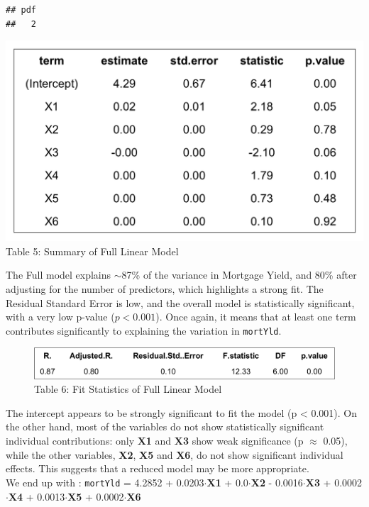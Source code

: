 \documentclass[
  12pt,
]{article}
\begin{document}
\begin{verbatim}
## pdf 
##   2
\end{verbatim}

\begin{minipage}{0.42\textwidth}
\includegraphics[width=1\linewidth]{figures/full_model_summary_table.png}
\vspace{-0.2em}
{\fontsize{12}{14}\selectfont Table 5: Summary of Full Linear Model}
\end{minipage}
\hfill
\begin{minipage}{0.55\textwidth}
The Full model explains $\sim$87\% of the variance in Mortgage Yield, and 80\% after adjusting for the number of predictors, which highlights a strong fit. The Residual Standard Error is low, and the overall model is statistically significant, with a very low p-value ($p < 0.001$). Once again, it means that at least one term contributes significantly to explaining the variation in \texttt{mortYld}.
\end{minipage}

\noindent \vspace{-5pt}

\begin{figure}[H]
  \centering
  \includegraphics[width=0.9\linewidth, height=0.15\textheight]{figures/full_model_fitstats_table.png}
  \caption*{{\fontsize{12}{14}\selectfont Table 6: Fit Statistics of Full Linear Model}}
\end{figure}
\addtocounter{table}{2}
\vspace{-5pt}

The intercept appears to be strongly significant to fit the model (p
\textless{} 0.001). On the other hand, most of the variables do not show
statistically significant individual contributions: only \textbf{X1} and
\textbf{X3} show weak significance (p \(\approx\) 0.05), while the other
variables, \textbf{X2}, \textbf{X5} and \textbf{X6}, do not show
significant individual effects. This suggests that a reduced model may
be more appropriate.\\
We end up with : \texttt{mortYld} = 4.2852 + 0.0203\(\cdot\)\textbf{X1}
+ 0.0\(\cdot\)\textbf{X2} - 0.0016\(\cdot\)\textbf{X3} +
0.0002\(\cdot\)\textbf{X4} + 0.0013\(\cdot\)\textbf{X5} +
0.0002\(\cdot\)\textbf{X6}
\end{document}
